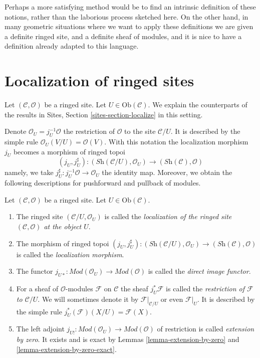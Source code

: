 \medskip\noindent
Perhaps a more satisfying method would be to find an intrinsic definition
of these notions, rather than the laborious process sketched here.
On the other hand, in many geometric situations where we want to apply
these definitions we are given a definite ringed site, and a definite
sheaf of modules, and it is nice to have a definition already adapted to
this language.




\section{Localization of ringed sites}
\label{section-localize}

\noindent
Let $(\mathcal{C}, \mathcal{O})$ be a ringed site.
Let $U \in \text{Ob}(\mathcal{C})$.
We explain the counterparts of the results in
Sites, Section \ref{sites-section-localize}
in this setting.

\medskip\noindent
Denote
$\mathcal{O}_U = j_U^{-1}\mathcal{O}$ the restriction of $\mathcal{O}$
to the site $\mathcal{C}/U$. It is described by the simple
rule $\mathcal{O}_U(V/U) = \mathcal{O}(V)$. With this notation
the localization morphism $j_U$ becomes a morphism of ringed topoi
$$
(j_U, j_U^\sharp) :
(\textit{Sh}(\mathcal{C}/U), \mathcal{O}_U)
\longrightarrow
(\textit{Sh}(\mathcal{C}), \mathcal{O})
$$
namely, we take $j_U^\sharp : j_U^{-1}\mathcal{O} \to \mathcal{O}_U$
the identity map.
Moreover, we obtain the following descriptions for pushforward
and pullback of modules.

\begin{definition}
\label{definition-localize-ringed-site}
Let $(\mathcal{C}, \mathcal{O})$ be a ringed site.
Let $U \in \text{Ob}(\mathcal{C})$.
\begin{enumerate}
\item The ringed site $(\mathcal{C}/U, \mathcal{O}_U)$ is called the
{\it localization of the ringed site $(\mathcal{C}, \mathcal{O})$
at the object $U$}.
\item The morphism of ringed topoi
$(j_U, j_U^\sharp) :
(\textit{Sh}(\mathcal{C}/U), \mathcal{O}_U)
\to
(\textit{Sh}(\mathcal{C}), \mathcal{O})$
is called the {\it localization morphism}.
\item The functor
$j_{U*} : \textit{Mod}(\mathcal{O}_U) \to \textit{Mod}(\mathcal{O})$
is called the {\it direct image functor}.
\item For a sheaf of $\mathcal{O}$-modules $\mathcal{F}$ on $\mathcal{C}$
the sheaf $j_U^*\mathcal{F}$ is called the
{\it restriction of $\mathcal{F}$ to $\mathcal{C}/U$}.
We will sometimes denote it by
$\mathcal{F}|_{\mathcal{C}/U}$ or even $\mathcal{F}|_U$.
It is described by the simple rule $j_U^*(\mathcal{F})(X/U) = \mathcal{F}(X)$.
\item The left adjoint
$j_{U!} : \textit{Mod}(\mathcal{O}_U) \to \textit{Mod}(\mathcal{O})$
of restriction is called {\it extension by zero}. It exists and is
exact by
Lemmas \ref{lemma-extension-by-zero} and
\ref{lemma-extension-by-zero-exact}.
\end{enumerate}
\end{definition}

